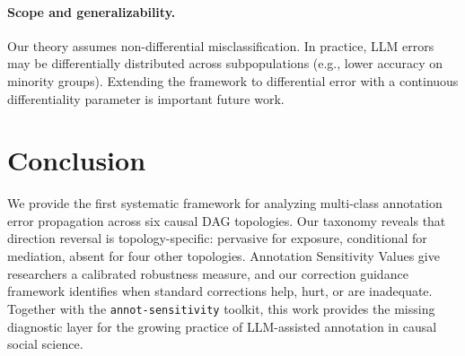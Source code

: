\documentclass[11pt,letterpaper]{article}
\begin{document}
\paragraph{Scope and generalizability.}
Our theory assumes non-differential misclassification.
In practice, LLM errors may be differentially distributed across subpopulations (e.g., lower accuracy on minority groups).
Extending the framework to differential error with a continuous differentiality parameter is important future work.

\section{Conclusion}

We provide the first systematic framework for analyzing multi-class annotation error propagation across six causal DAG topologies.
Our taxonomy reveals that direction reversal is topology-specific: pervasive for exposure, conditional for mediation, absent for four other topologies.
Annotation Sensitivity Values give researchers a calibrated robustness measure, and our correction guidance framework identifies when standard corrections help, hurt, or are inadequate.
Together with the \texttt{annot-sensitivity} toolkit, this work provides the missing diagnostic layer for the growing practice of LLM-assisted annotation in causal social science.
\end{document}
